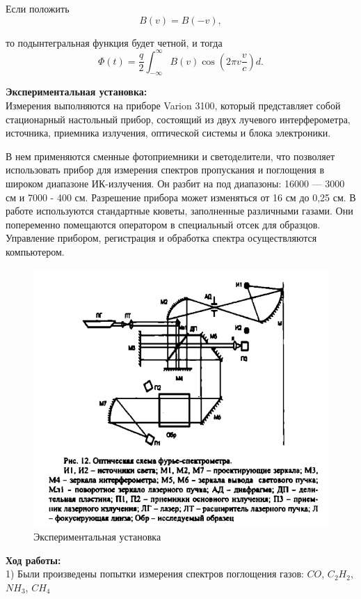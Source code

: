 \documentclass[a4paper, 12pt]{article}%
\begin{document}
	Если положить
	$$
	B(v)=B(-v),
	$$
	
	то подынтегральная функция будет четной, и тогда
	$$
	\Phi(t)=\frac{q}{2} \int_{-\infty}^{\infty} B(v) \cos \left(2 \pi v \frac{v}{c}\right) d .
	$$
	
	\textbf{Экспериментальная установка:}\\
	
	 Измерения выполняются на приборе Varion 3100, который представляет собой стационарный настольный прибор, состоящий из
	двух лучевого интерферометра, источника, приемника излучения,
	оптической системы и блока электроники.
	\par В нем применяются сменные фотоприемники и светоделители,
	что позволяет использовать прибор для измерения спектров пропускания и поглощения в широком диапазоне ИК-излучения. Он разбит
	на под диапазоны: 16000 — 3000 см и 7000 - 400 см. Разрешение
	прибора может изменяться от 16 см до 0,25 см. В работе используются стандартные кюветы, заполненные различными газами. Они
	попеременно помещаются оператором в специальный отсек для образцов. Управление прибором, регистрация и обработка спектра
	осуществляются компьютером. 
	
	
	\begin{figure}[H]
		\centering
		\includegraphics[width=1\linewidth]{ust}
		\caption{Экспериментальная установка}
	\end{figure}
	
	\textbf{Ход работы:}\\
	
	1) Были произведены попытки измерения спектров поглощения газов: $CO$, $C_2H_2$, $NH_3$, $CH_4$\\
	
	
	
	
	
	
	
\end{document}
